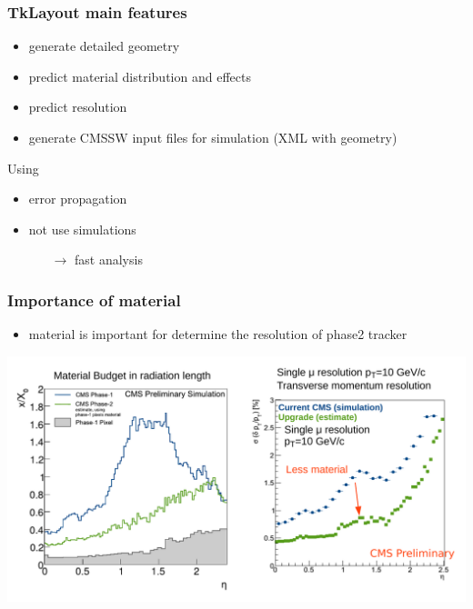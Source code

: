 \documentclass[pdftex, 11pt]{beamer}
\begin{document}
\begin{frame}
  \frametitle{TkLayout main features}
  \begin{itemize}
  \item generate detailed \alert{geometry}
    \pause
  \item predict \alert{material} distribution and effects
    \pause
  \item predict \alert{resolution}
    \pause
  \item generate \alert{CMSSW} input files for simulation (XML with geometry)
    \pause
  \end{itemize}
  \pause
  \begin{block}{Using}
    \begin{itemize}
    \item error \alert{propagation}
    \item \alert{not} use simulations
      \begin{itemize}
      \item[$\rightarrow$] \alert{fast} analysis
      \end{itemize}
    \end{itemize}
  \end{block}
\end{frame}

\begin{frame}
  \frametitle{Importance of material}
  \begin{itemize}
  \item material is important for determine the
    \alert{resolution} of phase2 tracker
  \end{itemize}
  \begin{center}
      \includegraphics[width=\textwidth]{img/trackMatRes.pdf}
  \end{center}
\end{frame}
\end{document}
